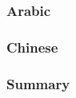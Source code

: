 



\subsubsection{Arabic}



\subsubsection{Chinese}



\subsubsection{Summary}
























